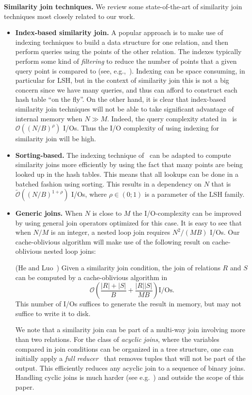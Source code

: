 \documentclass{llncs}
\newcommand{\Osymbol}{{\mathcal O}}
\newcommand{\BO}[1]{\Osymbol\left(#1\right)}
\newcommand{\TO}[1]{\tilde{\Osymbol}\left(#1\right)}
\begin{document}
\smallskip

\textbf{Similarity join techniques.}
We review some state-of-the-art of similarity join techniques most closely related to our work.

\begin{itemize}
	\item \textbf{Index-based similarity join.}
A popular approach is to make use of indexing techniques to build a data structure for one relation, and then perform queries using the points of the other relation.
The indexes typically perform some kind of \emph{filtering} to reduce the number of points that a given query point is compared to (see, e.g.,~\cite{Bayardo_WWW07,Chaudhuri_ICDE06,Gionis_VLDB99}).
Indexing can be space consuming, in particular for LSH, but in the context of similarity join this is not a big concern since we have many queries, and thus can afford to construct each hash table ``on the fly''.
On the other hand, it is clear that index-based similarity join techniques will not be able to take significant advantage of internal memory when $N\gg M$.
Indeed, the query complexity stated in~\cite{Gionis_VLDB99} is $\BO{(N/B)^\rho}$ I/Os.
Thus the I/O complexity of using indexing for similarity join will be high.
\item \textbf{Sorting-based.}\label{sec:sorting}
The indexing technique of~\cite{Gionis_VLDB99} can be adapted to compute similarity joins more efficiently by using the fact that many points are being looked up in the hash tables.
This means that all lookups can be done in a batched fashion using sorting.
This results in a dependency on $N$ that is $\TO{(N/B)^{1 + \rho}}$ I/Os, where $\rho \in (0;1)$ is a parameter of the LSH family.
\item \textbf{Generic joins.}\label{sec:generic}
When $N$ is close to $M$ the I/O-complexity can be improved by using general join operators optimized for this case.
It is easy to see that when $N/M$ is an integer, a nested loop join requires $N^2/(MB)$ I/Os.
Our cache-oblivious algorithm will make use of the following result on cache-oblivious nested loop joins:

\begin{theorem}(He and Luo~\cite{he2006cache})\label{thm:co-nested-loop}
	Given a similarity join condition, the join of relations $R$ and $S$ can be computed by a cache-oblivious algorithm in
	$$\BO{\frac{|R|+|S|}{B} + \frac{|R||S|}{MB}} \text{I/Os}.$$ 
		This number of I/Os suffices to generate the result in memory, but may not suffice to write it to disk.
\end{theorem}

We note that a similarity join can be part of a multi-way join involving more than two relations. For the class of \emph{acyclic joins}, where the variables compared in join conditions can be organized in a tree structure, one can initially apply a \emph{full reducer}~\cite{Yannakakis_VLDB81} that removes tuples that will not be part of the output. This efficiently reduces any acyclic join to a sequence of binary joins. Handling cyclic joins is much harder (see e.g.~\cite{Ngo_SIGMOD13}) and outside the scope of this paper.

\end{itemize}
\end{document}
